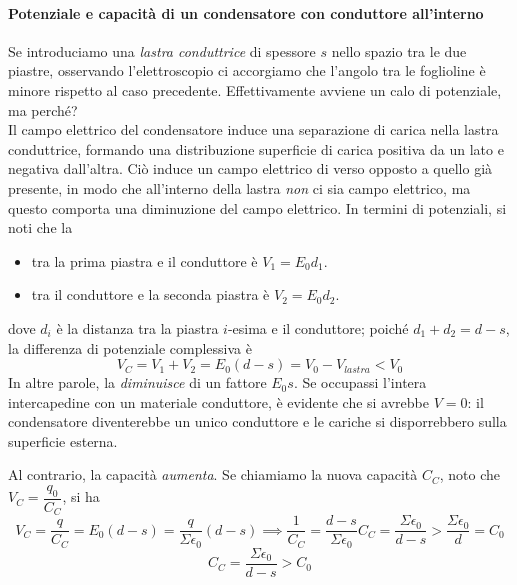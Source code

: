 \paragraph{Potenziale e capacità di un condensatore con conduttore all'interno}
Se introduciamo una \textit{lastra conduttrice} di spessore $s$ nello spazio tra le due piastre, osservando l'elettroscopio ci accorgiamo che l'angolo tra le foglioline è minore rispetto al caso precedente. Effettivamente avviene un calo di potenziale, ma perché?\\
Il campo elettrico del condensatore induce una separazione di carica nella lastra conduttrice, formando una distribuzione superficie di carica positiva da un lato e negativa dall'altra. Ciò induce un campo elettrico di verso opposto a quello già presente, in modo che all'interno della lastra \textit{non} ci sia campo elettrico, ma questo comporta una diminuzione del campo elettrico. In termini di potenziali, si noti che la \ddp
\begin{itemize}
	\item tra la prima piastra e il conduttore è $V_1=E_0d_1$.
	\item tra il conduttore e la seconda piastra è $V_2=E_0d_2$.
\end{itemize}
dove $d_i$ è la distanza tra la piastra $i$-esima e il conduttore; poiché $d_1+d_2=d-s$, la differenza di potenziale complessiva è
\begin{equation*}
	V_{C}=V_1+V_2=E_0\left(d-s\right)=V_0-V_{lastra}<V_0
\end{equation*}
In altre parole, la \ddp \textit{diminuisce} di un fattore $E_0s$. Se occupassi l'intera intercapedine con un materiale conduttore, è evidente che si avrebbe $V=0$: il condensatore diventerebbe un unico conduttore e le cariche si disporrebbero sulla superficie esterna.

Al contrario, la capacità \textit{aumenta}. Se chiamiamo la nuova capacità $C_C$, noto che $V_{C}=\dfrac{q_0}{C_C}$, si ha
\begin{equation*}
	V_C=\frac{q}{C_C}=E_0\left(d-s\right)=\frac{q}{\Sigma \epsilon_0}\left(d-s\right)\implies \frac{1}{C_C}=\frac{d-s}{\Sigma \epsilon_0}C_C=\frac{\Sigma \epsilon_0}{d-s}>\frac{\Sigma \epsilon_0}{d}=C_0
\end{equation*}
\begin{equation}
	C_C=\frac{\Sigma \epsilon_0}{d-s}>C_0
\end{equation}
